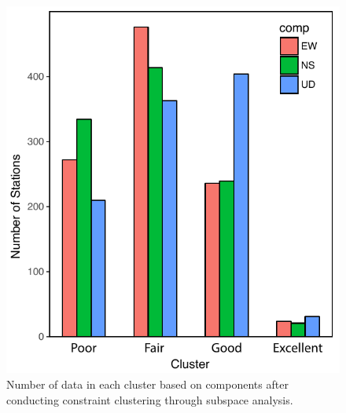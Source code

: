 \begin{figure}
    \centering
    \includegraphics[width=\columnwidth]{figures/pdf/Figure_9.pdf}
    \caption{Number of data in each cluster based on components after conducting constraint \kmeans{} clustering through subspace analysis.}
    \label{fig:Figure_cluster_barplot}
\end{figure}



